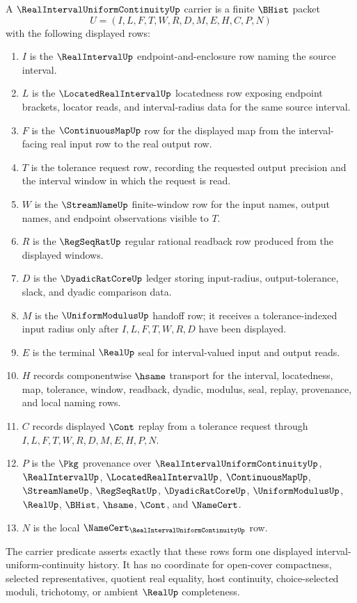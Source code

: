 \begin{definition}
\label{def:real-interval-uniform-continuity-carrier}
A $\RealIntervalUniformContinuityUp$ carrier is a finite $\BHist$ packet
$$
U=(I,L,F,T,W,R,D,M,E,H,C,P,N)
$$
with the following displayed rows:
\begin{enumerate}
\item $I$ is the $\RealIntervalUp$ endpoint-and-enclosure row naming the source interval.
\item $L$ is the $\LocatedRealIntervalUp$ locatedness row exposing endpoint brackets, locator reads, and interval-radius data for the same source interval.
\item $F$ is the $\ContinuousMapUp$ row for the displayed map from the interval-facing real input row to the real output row.
\item $T$ is the tolerance request row, recording the requested output precision and the interval window in which the request is read.
\item $W$ is the $\StreamNameUp$ finite-window row for the input names, output names, and endpoint observations visible to $T$.
\item $R$ is the $\RegSeqRatUp$ regular rational readback row produced from the displayed windows.
\item $D$ is the $\DyadicRatCoreUp$ ledger storing input-radius, output-tolerance, slack, and dyadic comparison data.
\item $M$ is the $\UniformModulusUp$ handoff row; it receives a tolerance-indexed input radius only after $I,L,F,T,W,R,D$ have been displayed.
\item $E$ is the terminal $\RealUp$ seal for interval-valued input and output reads.
\item $H$ records componentwise $\hsame$ transport for the interval, locatedness, map, tolerance, window, readback, dyadic, modulus, seal, replay, provenance, and local naming rows.
\item $C$ records displayed $\Cont$ replay from a tolerance request through $I,L,F,T,W,R,D,M,E,H,P,N$.
\item $P$ is the $\Pkg$ provenance over $\RealIntervalUniformContinuityUp$, $\RealIntervalUp$, $\LocatedRealIntervalUp$, $\ContinuousMapUp$, $\StreamNameUp$, $\RegSeqRatUp$, $\DyadicRatCoreUp$, $\UniformModulusUp$, $\RealUp$, $\BHist$, $\hsame$, $\Cont$, and $\NameCert$.
\item $N$ is the local $\NameCert_{\RealIntervalUniformContinuityUp}$ row.
\end{enumerate}
The carrier predicate asserts exactly that these rows form one displayed interval-uniform-continuity history. It has no coordinate for open-cover compactness, selected representatives, quotient real equality, host continuity, choice-selected moduli, trichotomy, or ambient $\RealUp$ completeness.
\end{definition}

